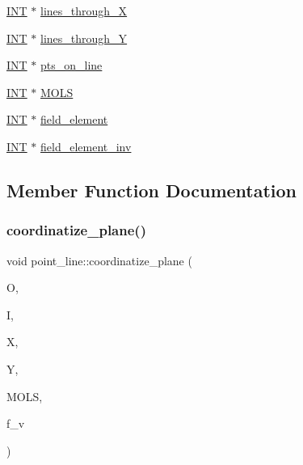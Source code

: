 \begin{DoxyCompactItemize}
\item 
\mbox{\hyperlink{galois_8h_a09fddde158a3a20bd2dcadb609de11dc}{I\+NT}} $\ast$ \mbox{\hyperlink{classpoint__line_a532245b9a155a6168b6d031206885a79}{lines\+\_\+through\+\_\+X}}
\item 
\mbox{\hyperlink{galois_8h_a09fddde158a3a20bd2dcadb609de11dc}{I\+NT}} $\ast$ \mbox{\hyperlink{classpoint__line_adf4820c5c73e7826961845f25a79eadc}{lines\+\_\+through\+\_\+Y}}
\item 
\mbox{\hyperlink{galois_8h_a09fddde158a3a20bd2dcadb609de11dc}{I\+NT}} $\ast$ \mbox{\hyperlink{classpoint__line_a4c82f63b3446d8e9f371a364128fc9d9}{pts\+\_\+on\+\_\+line}}
\item 
\mbox{\hyperlink{galois_8h_a09fddde158a3a20bd2dcadb609de11dc}{I\+NT}} $\ast$ \mbox{\hyperlink{classpoint__line_aa4033d5369b106927e3465ca7dfeea66}{M\+O\+LS}}
\item 
\mbox{\hyperlink{galois_8h_a09fddde158a3a20bd2dcadb609de11dc}{I\+NT}} $\ast$ \mbox{\hyperlink{classpoint__line_a4bb5fd900d13c0a1d7a994c68630736f}{field\+\_\+element}}
\item 
\mbox{\hyperlink{galois_8h_a09fddde158a3a20bd2dcadb609de11dc}{I\+NT}} $\ast$ \mbox{\hyperlink{classpoint__line_a3c823d887a434ec7ab5b6bca7c854876}{field\+\_\+element\+\_\+inv}}
\end{DoxyCompactItemize}


\subsection{Member Function Documentation}
\mbox{\label{classpoint__line_a121d61db202b5bbd07f33a148a2df735}} 
\subsubsection{\texorpdfstring{coordinatize\+\_\+plane()}{coordinatize\_plane()}}
{\footnotesize\ttfamily void point\+\_\+line\+::coordinatize\+\_\+plane (\begin{DoxyParamCaption}\item[{\mbox{\hyperlink{galois_8h_a09fddde158a3a20bd2dcadb609de11dc}{I\+NT}}}]{O,  }\item[{\mbox{\hyperlink{galois_8h_a09fddde158a3a20bd2dcadb609de11dc}{I\+NT}}}]{I,  }\item[{\mbox{\hyperlink{galois_8h_a09fddde158a3a20bd2dcadb609de11dc}{I\+NT}}}]{X,  }\item[{\mbox{\hyperlink{galois_8h_a09fddde158a3a20bd2dcadb609de11dc}{I\+NT}}}]{Y,  }\item[{\mbox{\hyperlink{galois_8h_a09fddde158a3a20bd2dcadb609de11dc}{I\+NT}} $\ast$}]{M\+O\+LS,  }\item[{\mbox{\hyperlink{galois_8h_a09fddde158a3a20bd2dcadb609de11dc}{I\+NT}}}]{f\+\_\+v }\end{DoxyParamCaption})}

